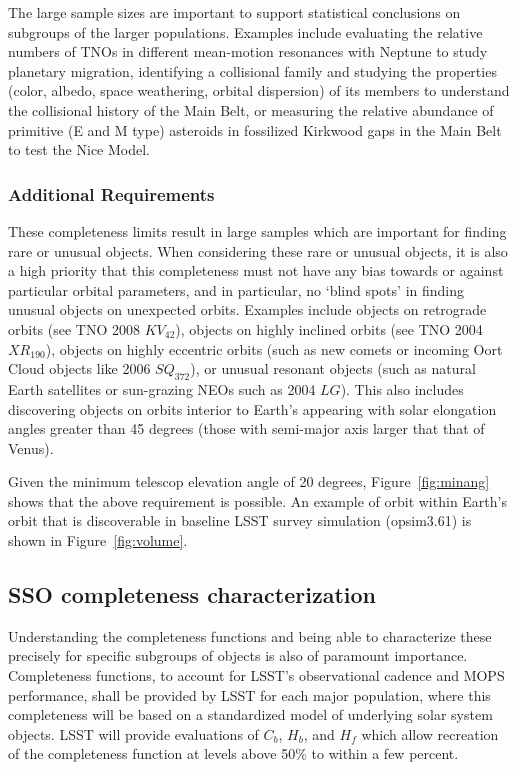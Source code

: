 \documentclass[manuscript]{aastex}
\begin{document}
The large sample sizes are important to support statistical conclusions on subgroups of the larger populations. Examples include evaluating the relative numbers of TNOs in different mean-motion resonances with Neptune to study planetary migration, identifying a collisional family and studying the properties (color, albedo, space weathering, orbital dispersion) of its members to understand the collisional history of the Main Belt, or measuring the relative abundance of primitive (E and M type) asteroids in fossilized Kirkwood gaps in the Main Belt to test the Nice Model. 


\subsubsection{Additional Requirements}

These completeness limits result in large samples which are important for finding rare or unusual objects. When considering these rare or unusual objects, it is also a high priority that this completeness must not have any bias towards or against particular orbital parameters, and in particular, no `blind spots' in finding unusual objects on unexpected orbits. Examples include objects on retrograde orbits (see TNO 2008 $KV_{42}$), objects on highly inclined orbits (see TNO 2004 $XR_{190}$),  objects on highly eccentric orbits (such as new comets or incoming Oort Cloud objects like 2006 $SQ_{372}$), or unusual resonant objects (such as natural Earth satellites or sun-grazing NEOs such as 2004 $LG$).  This also includes discovering objects on orbits interior to Earth's appearing with solar elongation angles greater than 45 degrees (those with semi-major axis larger that that of Venus). 

Given the minimum telescop elevation angle of 20 degrees, Figure~\ref{fig:minang} shows that the 
above requirement is possible. An example of orbit within Earth's orbit that is discoverable in
baseline LSST survey simulation (opsim3.61) is shown in Figure~\ref{fig:volume}. 



\subsection{SSO completeness characterization}

Understanding the completeness functions and being able to characterize these precisely for specific subgroups of objects is also of paramount importance. Completeness functions, to account for LSST's observational cadence and MOPS performance, shall be provided by LSST for each major population, where this completeness will be based on a standardized model of underlying solar system objects. LSST will provide evaluations of $C_b$, $H_b$, and $H_f$ which allow recreation of the completeness function at levels above 50\% to within a few percent. 
\end{document}
